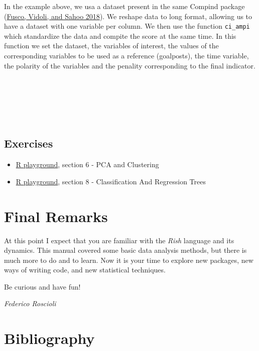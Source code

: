 \documentclass[
]{svmono}
\begin{document}
In the example above, we usa a dataset present in the same Compind
package (\protect\hyperlink{ref-compind}{Fusco, Vidoli, and Sahoo 2018}). We reshape data to long format, allowing us to have
a dataset with one variable per column. We then use the function
\texttt{ci\_ampi} which standardize the data and compite the score at the same
time. In this function we set the dataset, the variables of interest,
the values of the corresponding variables to be used as a reference
(goalposts), the time variable, the polarity of the variables and the
penality corresponding to the final indicator.

~

~

~

\hypertarget{exercises-5}{%
\section{Exercises}\label{exercises-5}}

\begin{itemize}
\item
  \href{https://federicoroscioli.shinyapps.io/exercises/}{R playground},
  section 6 - PCA and Clustering
\item
  \href{https://federicoroscioli.shinyapps.io/exercises/}{R playground},
  section 8 - Classification And Regression Trees
\end{itemize}

\newpage

\hypertarget{final-remarks}{%
\chapter*{Final Remarks}\label{final-remarks}}

At this point I expect that you are familiar with the \emph{Rish} language
and its dynamics. This manual covered some basic data analysis methods,
but there is much more to do and to learn. Now it is your time to
explore new packages, new ways of writing code, and new statistical
techniques.

Be curious and have fun!

\emph{Federico Roscioli}

\newpage

\hypertarget{bibliography}{%
\chapter*{Bibliography}\label{bibliography}}
\end{document}
